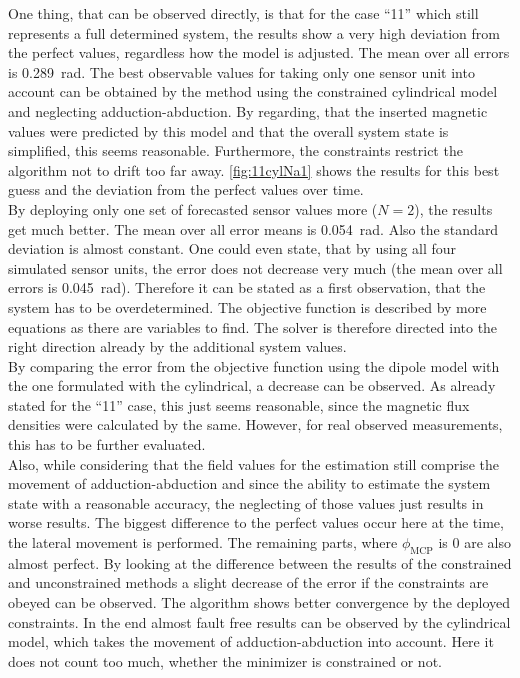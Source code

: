 One thing, that can be observed directly, is that for the case ``11'' which still represents a full determined system, the results show a very high deviation from the perfect values, regardless how the model is adjusted. The mean over all errors is \SI{0.289}{\radian}. The best observable values for taking only one sensor unit into account can be obtained by the method using the constrained cylindrical model and neglecting adduction-abduction. By regarding, that the inserted magnetic values were predicted by this model and that the overall system state is simplified, this seems reasonable. Furthermore, the constraints restrict the algorithm not to drift too far away. \ref{fig:11cylNa1} shows the results for this best guess and the deviation from the perfect values over time. \\
By deploying only one set of forecasted sensor values more ($ N = 2 $), the results get much better. The mean over all error means is \SI{0.054}{\radian}. Also the standard deviation is almost constant. One could even state, that by using all four simulated sensor units, the error does not decrease very much (the mean over all errors is \SI{0.045}{\radian}). Therefore it can be stated as a first observation, that the system has to be overdetermined. The objective function is described by more equations as there are variables to find. The solver is therefore directed into the right direction already by the additional system values.\\
By comparing the error from the objective function using the dipole model with the one formulated with the cylindrical, a decrease can be observed. As already stated for the ``11'' case, this just seems reasonable, since the magnetic flux densities were calculated by the same. However, for real observed measurements, this has to be further evaluated.\\
Also, while considering that the field values for the estimation still comprise the movement of adduction-abduction and since the ability to estimate the system state with a reasonable accuracy, the neglecting of those values just results in worse results. The biggest difference to the perfect values occur here at the time, the lateral movement is performed. The remaining parts, where $ \phi_{\mathrm{MCP}} $ is 0 are also almost perfect. By looking at the difference between the results of the constrained and unconstrained methods a slight decrease of the error if the constraints are obeyed can be observed. The algorithm shows better convergence by the deployed constraints. In the end almost fault free results can be observed by the cylindrical model, which takes the movement of adduction-abduction into account. Here it does not count too much, whether the minimizer is constrained or not. %
